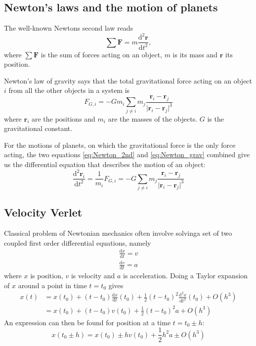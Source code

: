 \documentclass[reprint, english,notitlepage,nofootinbib]{revtex4-1}  %
\newcommand{\vc}[1]{\mathbf{#1}}
\begin{document}
\subsection{Newton's laws and the motion of planets}

The well-known Newtons second law reads
\begin{equation}
  \label{eq:Newton_2nd}
  \sum \vc F = m \frac{\mathrm d^2 \vc r}{\mathrm d t^2},
\end{equation}
where $\sum \vc F$ is the sum of forces acting on an object, $m$ is its mass and $\vc r$ its position.

Newton's law of gravity says that the total gravitational force acting on an object $i$ from all the other objects in a system is
\begin{equation}
  \label{eq:Newton_grav}
  F_{G, i} = - G m_i \sum_{j \neq i} m_j \frac{\vc r_i - \vc r_j}{ \lvert \vc r_i - \vc r_j \rvert ^3}
\end{equation}
where $\vc r_i$ are the positions and $m_i$ are the masses of the objects. $G$ is the gravitational constant.

For the motions of planets, on which the gravitational force is the only force acting, the two equations \ref{eq:Newton_2nd} and \ref{eq:Newton_grav} combined give us the differential equation that describes the motion of an object:
\begin{equation}
  \label{eq:DE}
  \frac{\mathrm d^2 \vc r_i}{\mathrm d t^2} = \frac{1}{m_i} F_{G, i} = - G \sum_{j \neq i} m_j \frac{\vc r_i - \vc r_j}{ \lvert \vc r_i - \vc r_j \rvert ^3}
\end{equation}


\subsection{Velocity Verlet}

Classical problem of Newtonian mechanics often involve solvinga set of two coupled first order differential equations, namely
\begin{align*}
  \frac{\mathrm d x}{\mathrm dt} = v \\
  \frac{\mathrm d v}{\mathrm dt} = a
\end{align*}
where $x$ is position, $v$ is velocity and $a$ is acceleration. Doing a Taylor expansion of $x$ around a point in time $t = t_0$ gives
\begin{align*}
  x(t) &= x(t_0) + (t - t_0) \frac{\mathrm d x}{\mathrm dt}(t_0) + \frac{1}{2} (t - t_0)^2 \frac{\mathrm d^2 x}{\mathrm dt^2}(t_0) + O(h^3) \\
  &= x(t_0) + (t - t_0) v(t_0) + \frac{1}{2} (t - t_0)^2 a + O(h^3)
\end{align*}
An expression can then be found for position at a time $t = t_0 \pm h$:
\begin{equation}
  \label{eq:Taylor_exp_x}
  x(t_0 \pm h) = x(t_0) \pm h v(t_0) + \frac{1}{2} h^2 a \pm O(h^3)
\end{equation}
\end{document}
